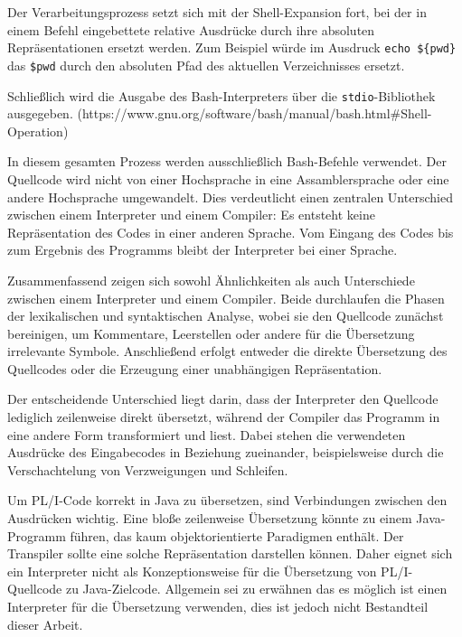 Der Verarbeitungsprozess setzt sich mit der Shell-Expansion fort, bei der in einem Befehl eingebettete relative Ausdrücke durch ihre absoluten Repräsentationen ersetzt werden. Zum Beispiel würde im Ausdruck \verb+echo ${pwd}+ das \verb+$pwd+ durch den absoluten Pfad des aktuellen Verzeichnisses ersetzt.

Schließlich wird die Ausgabe des Bash-Interpreters über die \verb+stdio+-Bibliothek ausgegeben.
(https://www.gnu.org/software/bash/manual/bash.html#Shell-Operation)

In diesem gesamten Prozess werden ausschließlich Bash-Befehle verwendet. Der Quellcode wird nicht von einer Hochsprache in eine Assamblersprache oder eine andere Hochsprache umgewandelt. Dies verdeutlicht einen zentralen Unterschied zwischen einem Interpreter und einem Compiler: Es entsteht keine Repräsentation des Codes in einer anderen Sprache. Vom Eingang des Codes bis zum Ergebnis des Programms bleibt der Interpreter bei einer Sprache. 


Zusammenfassend zeigen sich sowohl Ähnlichkeiten als auch Unterschiede zwischen einem Interpreter und einem Compiler. Beide durchlaufen die Phasen der lexikalischen und syntaktischen Analyse, wobei sie den Quellcode zunächst bereinigen, um Kommentare, Leerstellen oder andere für die Übersetzung irrelevante Symbole. Anschließend erfolgt entweder die direkte Übersetzung des Quellcodes oder die Erzeugung einer unabhängigen Repräsentation.

Der entscheidende Unterschied liegt darin, dass der Interpreter den Quellcode lediglich zeilenweise direkt übersetzt, während der Compiler das Programm in eine andere Form transformiert und liest. Dabei stehen die verwendeten Ausdrücke des Eingabecodes in Beziehung zueinander, beispielsweise durch die Verschachtelung von Verzweigungen und Schleifen.

Um PL/I-Code korrekt in Java zu übersetzen, sind Verbindungen zwischen den Ausdrücken wichtig. Eine bloße zeilenweise Übersetzung könnte zu einem Java-Programm führen, das kaum objektorientierte Paradigmen enthält. Der Transpiler sollte eine solche Repräsentation darstellen können.
Daher eignet sich ein Interpreter nicht als Konzeptionsweise für die Übersetzung von PL/I-Quellcode zu Java-Zielcode. Allgemein sei zu erwähnen das es möglich ist einen Interpreter für die Übersetzung verwenden, dies ist jedoch nicht Bestandteil dieser Arbeit.

